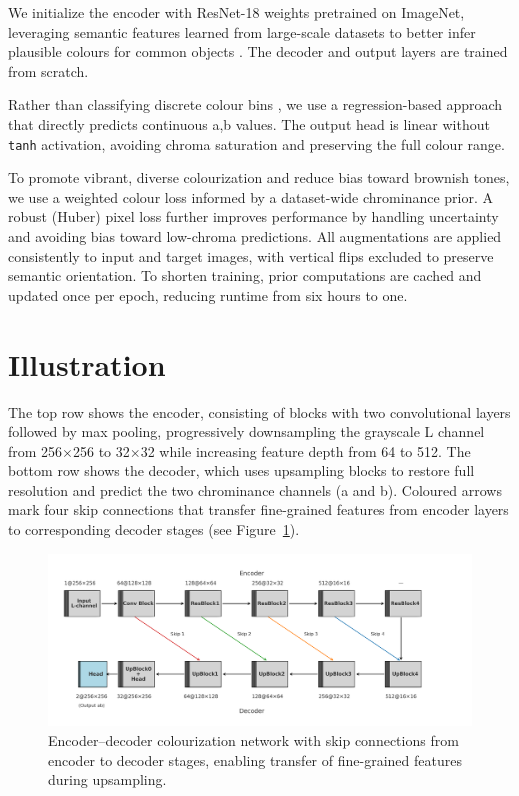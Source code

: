 \documentclass{article} %
\begin{document}
We initialize the encoder with ResNet-18 weights pretrained on ImageNet, leveraging semantic features learned from large-scale datasets to better infer plausible colours for common objects 
\citep{olah2022lettherebecolor}. The decoder and output layers are trained from scratch.

Rather than classifying discrete colour bins \citep{olah2022lettherebecolor}, we use a regression-based approach that directly predicts continuous a,b values. The output head is linear without 
\verb|tanh| activation, avoiding chroma saturation and preserving the full colour range.

To promote vibrant, diverse colourization and reduce bias toward brownish tones, we use a weighted colour loss informed by a dataset-wide chrominance prior. A robust (Huber) pixel loss further 
improves performance by handling uncertainty and avoiding bias toward low-chroma predictions. All augmentations are applied consistently to input and target images, with vertical flips excluded 
to preserve semantic orientation. To shorten training, prior computations are cached and updated once per epoch, reducing runtime from six hours to one.

\section{Illustration}

The top row shows the encoder, consisting of blocks with two convolutional layers followed by max pooling, progressively downsampling the grayscale L channel from 256$\times$256 to 
32$\times$32 while increasing feature depth from 64 to 512. The bottom row shows the decoder, which uses upsampling blocks to restore full resolution and predict the two chrominance channels 
(a and b). Coloured arrows mark four skip connections that transfer fine-grained features from encoder layers to corresponding decoder stages (see Figure~\ref{fig:architecture}).

\begin{figure}[H]
  \centering
  \vspace{-1em} %
  \includegraphics[width=1.1\linewidth]{Figs/architecture-diagram.png}
  \vspace{-0.5em} %
  \caption{Encoder–decoder colourization network with skip connections from encoder to decoder stages, 
  enabling transfer of fine-grained features during upsampling.}
  \label{fig:architecture}
\end{figure}
\end{document}

